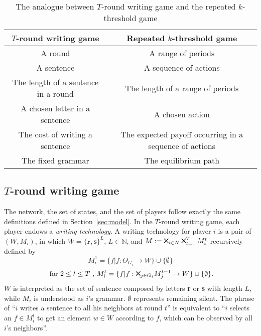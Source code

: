 \documentclass[12pt,letter]{article}
\theoremstyle{definition}
\theoremstyle{definition}
\theoremstyle{remark}
\theoremstyle{claim}
\newcommand{\bigtimes}{\mathbin{\tikz [x=1.4ex,y=1.4ex,line width=.2ex] \draw (0,0) -- (1,1) (0,1) -- (1,0);}}%
\begin{document}
\begin{table}[!htbp]
\caption{The analogue between $T$-round writing game and the repeated $k$-threshold game}
\label{table:analogue}
\begin{center}
\begin{tabular}{cc }
$T$-round writing game & Repeated $k$-threshold game \\
\hline
\hline
A round & A range of periods\\
A sentence & A sequence of actions \\
The length of a sentence in a round & The length of a range of periods\\
A chosen letter in a sentence & A chosen action\\
The cost of writing a sentence & The expected payoff occurring in a sequence of actions\\
The fixed grammar & The equilibrium path\\
\hline
\end{tabular}
\end{center}

\end{table}


\subsection{$T$-round writing game}
\label{sec:writing}
The network, the set of states, and the set of players follow exactly the same definitions defined in Section~\ref{sec:model}. In the $T$-round writing game, each player endows a \textit{writing technology}. A writing technology for player $i$ is a pair of $(W,M_i)$, in which $W=\{{\textbf{r}},\textbf{s}\}^L$, $L\in \mathbb{N}$, and $M:= \bigtimes_{i\in N}\bigtimes^T_{t=1}M^{t}_i$ recursively defined by
\[M^1_i=\{f|f:\Theta_{G_i}\rightarrow W\}\cup \{\emptyset\}\]
\[ \text{ for } 2\leq t \leq T\text{ , }M^{t}_i=\{f|f:\bigtimes_{j\in G_i}M^{t-1}_j\rightarrow W\}\cup \{\emptyset\}. \]
$W$ is interpreted as the set of sentence composed by letters \textbf{r} or \textbf{s} with length $L$, while $M_i$ is understood as $i$'s grammar. $\emptyset$ represents remaining silent. The phrase of ``$i$ writes a sentence to all his neighbors at round $t$'' is equivalent to ``$i$ selects an $f\in M^t_i$ to get an element $w\in W$ according to $f$, which can be observed by all $i$'s neighbors''. 
\end{document}
